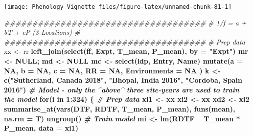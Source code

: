 \documentclass[
]{article}
\newenvironment{Shaded}{\begin{snugshade}}{\end{snugshade}}
\newcommand{\CommentTok}[1]{\textcolor[rgb]{0.56,0.35,0.01}{\textit{#1}}}
\newcommand{\ControlFlowTok}[1]{\textcolor[rgb]{0.13,0.29,0.53}{\textbf{#1}}}
\newcommand{\DataTypeTok}[1]{\textcolor[rgb]{0.13,0.29,0.53}{#1}}
\newcommand{\DecValTok}[1]{\textcolor[rgb]{0.00,0.00,0.81}{#1}}
\newcommand{\KeywordTok}[1]{\textcolor[rgb]{0.13,0.29,0.53}{\textbf{#1}}}
\newcommand{\NormalTok}[1]{#1}
\newcommand{\OperatorTok}[1]{\textcolor[rgb]{0.81,0.36,0.00}{\textbf{#1}}}
\newcommand{\OtherTok}[1]{\textcolor[rgb]{0.56,0.35,0.01}{#1}}
\newcommand{\StringTok}[1]{\textcolor[rgb]{0.31,0.60,0.02}{#1}}
\begin{document}
\texttt{[image: Phenology\_Vignette\_files/figure-latex/unnamed-chunk-81-1]}

\begin{Shaded}
\begin{Highlighting}[]
\CommentTok{####################################}
\CommentTok{# 1/f = a + bT + cP (3 Locations)  #}
\CommentTok{####################################}
\CommentTok{# Prep data}
\NormalTok{xx <-}\StringTok{ }\NormalTok{rr }\OperatorTok{%
\StringTok{  }\KeywordTok{left_join}\NormalTok{(}\KeywordTok{select}\NormalTok{(ff, Expt, T_mean, P_mean), }\DataTypeTok{by =} \StringTok{"Expt"}\NormalTok{)}
\NormalTok{mr <-}\StringTok{ }\OtherTok{NULL}\NormalTok{; md <-}\StringTok{ }\OtherTok{NULL}
\NormalTok{mc <-}\StringTok{ }\KeywordTok{select}\NormalTok{(ldp, Entry, Name) }\OperatorTok{%
\StringTok{  }\KeywordTok{mutate}\NormalTok{(}\DataTypeTok{a =} \OtherTok{NA}\NormalTok{, }\DataTypeTok{b =} \OtherTok{NA}\NormalTok{, }\DataTypeTok{c =} \OtherTok{NA}\NormalTok{, }\DataTypeTok{RR =} \OtherTok{NA}\NormalTok{, }\DataTypeTok{Environments =} \OtherTok{NA}\NormalTok{ )}
\NormalTok{k <-}\StringTok{ }\KeywordTok{c}\NormalTok{(}\StringTok{"Sutherland, Canada 2018"}\NormalTok{, }\StringTok{"Bhopal, India 2016"}\NormalTok{, }\StringTok{"Cordoba, Spain 2016"}\NormalTok{)}
\CommentTok{# Model - only the ^above^ three site-years are used to train the model}
\ControlFlowTok{for}\NormalTok{(i }\ControlFlowTok{in} \DecValTok{1}\OperatorTok{:}\DecValTok{324}\NormalTok{) \{}
  \CommentTok{# Prep data}
\NormalTok{  xi1 <-}\StringTok{ }\NormalTok{xx }\OperatorTok{%
\NormalTok{  xi2 <-}\StringTok{ }\NormalTok{xx }\OperatorTok{%
\NormalTok{  xd2 <-}\StringTok{ }\NormalTok{xi2 }\OperatorTok{%
\StringTok{    }\KeywordTok{summarise_at}\NormalTok{(}\KeywordTok{vars}\NormalTok{(DTF, RDTF, T_mean, P_mean), }\KeywordTok{funs}\NormalTok{(mean), }\DataTypeTok{na.rm =}\NormalTok{ T) }\OperatorTok{%
\StringTok{    }\KeywordTok{ungroup}\NormalTok{()}
  \CommentTok{# Train model}
\NormalTok{  mi <-}\StringTok{ }\KeywordTok{lm}\NormalTok{(RDTF }\OperatorTok{~}\StringTok{ }\NormalTok{T_mean }\OperatorTok{*}\StringTok{ }\NormalTok{P_mean, }\DataTypeTok{data =}\NormalTok{ xi1)}
}}}}}}
\end{Highlighting}
\end{Shaded}
\end{document}
